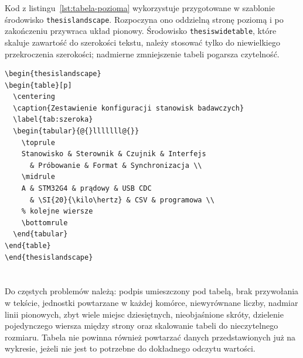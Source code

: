 Kod z listingu~\ref{lst:tabela-pozioma} wykorzystuje przygotowane w szablonie środowisko
\texttt{thesislandscape}. Rozpoczyna ono oddzielną stronę poziomą i po zakończeniu
przywraca układ pionowy. Środowisko \texttt{thesiswidetable}, które skaluje zawartość
do szerokości tekstu, należy stosować tylko do niewielkiego przekroczenia szerokości;
nadmierne zmniejszenie tabeli pogarsza czytelność.

\begin{lstlisting}[style=thesis,caption={Kod tabeli na stronie poziomej},label={lst:tabela-pozioma}]
\begin{thesislandscape}
\begin{table}[p]
  \centering
  \caption{Zestawienie konfiguracji stanowisk badawczych}
  \label{tab:szeroka}
  \begin{tabular}{@{}lllllll@{}}
    \toprule
    Stanowisko & Sterownik & Czujnik & Interfejs
      & Próbowanie & Format & Synchronizacja \\
    \midrule
    A & STM32G4 & prądowy & USB CDC
      & \SI{20}{\kilo\hertz} & CSV & programowa \\
    % kolejne wiersze
    \bottomrule
  \end{tabular}
\end{table}
\end{thesislandscape}
\end{lstlisting}

\section{}

Do częstych problemów należą: podpis umieszczony pod tabelą, brak przywołania w tekście,
jednostki powtarzane w każdej komórce, niewyrównane liczby, nadmiar linii pionowych,
zbyt wiele miejsc dziesiętnych, nieobjaśnione skróty, dzielenie pojedynczego wiersza
między strony oraz skalowanie tabeli do nieczytelnego rozmiaru. Tabela nie powinna
również powtarzać danych przedstawionych już na wykresie, jeżeli nie jest to potrzebne
do dokładnego odczytu wartości.
